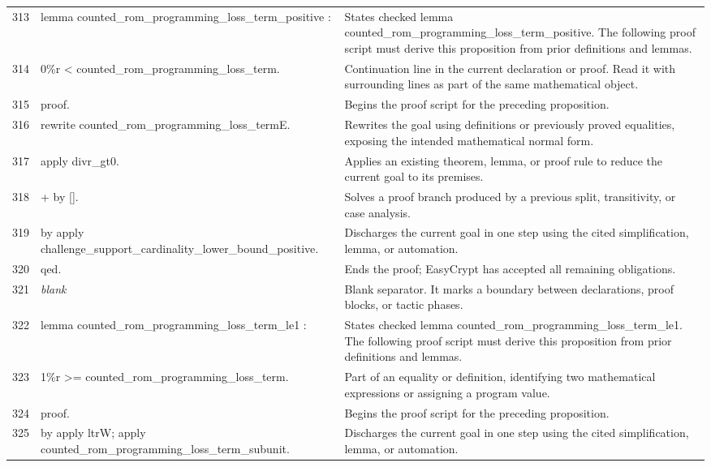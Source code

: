 \documentclass[10pt]{article}
\begin{document}
\begin{longtable}{r L{0.53\textwidth} L{0.37\textwidth}}
313 & {\ttfamily\scriptsize lemma counted\_rom\_programming\_loss\_term\_positive :} & States checked lemma counted\_rom\_programming\_loss\_term\_positive.  The following proof script must derive this proposition from prior definitions and lemmas. \\
314 & {\ttfamily\scriptsize   0\%r < counted\_rom\_programming\_loss\_term.} & Continuation line in the current declaration or proof.  Read it with surrounding lines as part of the same mathematical object. \\
315 & {\ttfamily\scriptsize proof.} & Begins the proof script for the preceding proposition. \\
316 & {\ttfamily\scriptsize rewrite counted\_rom\_programming\_loss\_termE.} & Rewrites the goal using definitions or previously proved equalities, exposing the intended mathematical normal form. \\
317 & {\ttfamily\scriptsize apply divr\_gt0.} & Applies an existing theorem, lemma, or proof rule to reduce the current goal to its premises. \\
318 & {\ttfamily\scriptsize + by [].} & Solves a proof branch produced by a previous split, transitivity, or case analysis. \\
319 & {\ttfamily\scriptsize by apply challenge\_support\_cardinality\_lower\_bound\_positive.} & Discharges the current goal in one step using the cited simplification, lemma, or automation. \\
320 & {\ttfamily\scriptsize qed.} & Ends the proof; EasyCrypt has accepted all remaining obligations. \\
321 & {\ttfamily\scriptsize \emph{blank}} & Blank separator.  It marks a boundary between declarations, proof blocks, or tactic phases. \\
322 & {\ttfamily\scriptsize lemma counted\_rom\_programming\_loss\_term\_le1 :} & States checked lemma counted\_rom\_programming\_loss\_term\_le1.  The following proof script must derive this proposition from prior definitions and lemmas. \\
323 & {\ttfamily\scriptsize   1\%r >= counted\_rom\_programming\_loss\_term.} & Part of an equality or definition, identifying two mathematical expressions or assigning a program value. \\
324 & {\ttfamily\scriptsize proof.} & Begins the proof script for the preceding proposition. \\
325 & {\ttfamily\scriptsize by apply ltrW; apply counted\_rom\_programming\_loss\_term\_subunit.} & Discharges the current goal in one step using the cited simplification, lemma, or automation. \\

\end{longtable}
\end{document}
